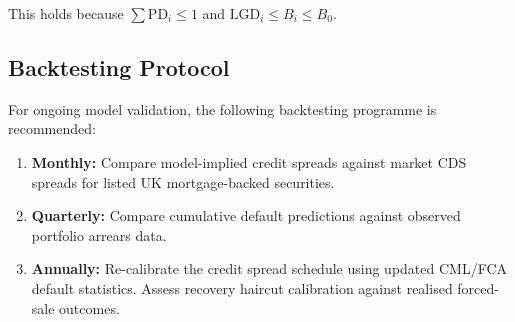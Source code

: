 \documentclass[11pt,a4paper]{article}
\begin{document}
\noindent This holds because $\sum \text{PD}_i \leq 1$ and $\text{LGD}_i \leq B_i \leq B_0$.

\subsection{Backtesting Protocol}

For ongoing model validation, the following backtesting programme is recommended:

\begin{enumerate}[nosep]
    \item \textbf{Monthly:} Compare model-implied credit spreads against market CDS
          spreads for listed UK mortgage-backed securities.
    \item \textbf{Quarterly:} Compare cumulative default predictions against observed
          portfolio arrears data.
    \item \textbf{Annually:} Re-calibrate the credit spread schedule using updated
          CML/FCA default statistics. Assess recovery haircut calibration against
          realised forced-sale outcomes.
\end{enumerate}

\mkmlimitations
\end{document}
